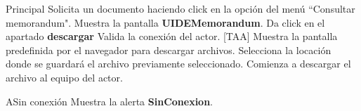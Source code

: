 \begin{UCtrayectoria}{Principal}
  \UCpaso[\UCactor] Solicita un documento haciendo click en la opción del menú ``Consultar memorandum".
  \UCpaso Muestra la pantalla  {\bf UIDEMemorandum}.
  \UCpaso[\UCactor] Da click en el apartado {\bf descargar} 
  \UCpaso Valida la conexión del actor. [TAA]
  \UCpaso Muestra la pantalla predefinida por el navegador para descargar archivos.
  \UCpaso[\UCactor] Selecciona la locación donde se guardará el archivo previamente seleccionado.
  \UCpaso Comienza a descargar el archivo al equipo del actor.
\end{UCtrayectoria}

\begin{UCtrayectoriaA}{A}{Sin conexión} 
\UCpaso Muestra la alerta {\bf SinConexion}.
\end{UCtrayectoriaA}


